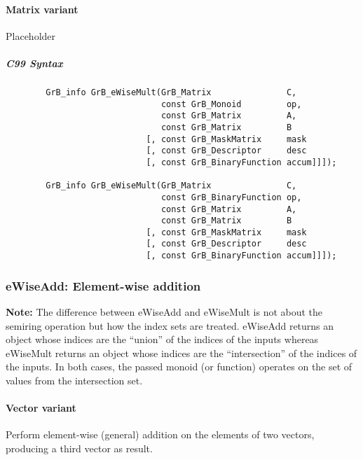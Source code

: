 \paragraph{Matrix variant}

Placeholder



\subparagraph{C99 Syntax}

\begin{verbatim}
        GrB_info GrB_eWiseMult(GrB_Matrix               C,
                               const GrB_Monoid         op, 
                               const GrB_Matrix         A,
                               const GrB_Matrix         B
                            [, const GrB_MaskMatrix     mask
                            [, const GrB_Descriptor     desc
                            [, const GrB_BinaryFunction accum]]]);
                            
        GrB_info GrB_eWiseMult(GrB_Matrix               C,
                               const GrB_BinaryFunction op, 
                               const GrB_Matrix         A,
                               const GrB_Matrix         B
                            [, const GrB_MaskMatrix     mask
                            [, const GrB_Descriptor     desc
                            [, const GrB_BinaryFunction accum]]]);
\end{verbatim}




\subsubsection{{\sf eWiseAdd}: Element-wise addition}

{\bf Note:} The difference between {\sf eWiseAdd} and {\sf eWiseMult} is not about the semiring operation but how the index sets are treated.
 {\sf eWiseAdd} returns an object whose indices are the ``union'' of the indices of the inputs whereas  
 {\sf eWiseMult} returns an object whose indices are the ``intersection'' of the indices of the inputs. In both cases, the passed monoid (or function) operates on the 
 set of values from the intersection set. 

\paragraph{Vector variant}

Perform element-wise (general) addition on the elements of two vectors,
producing a third vector as result.

